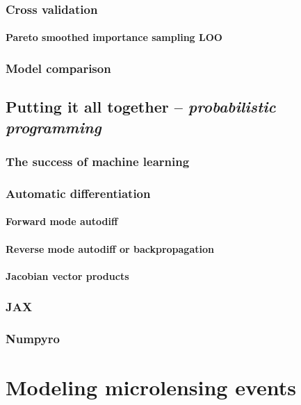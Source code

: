 \documentclass[]{report}
\begin{document}
\subsection{Cross validation}
\subsubsection{Pareto smoothed importance sampling LOO}
\subsection{Model comparison}

\section{Putting it all together -- \emph{probabilistic programming}}
\subsection{The success of machine learning}
\subsection{Automatic differentiation}
\subsubsection{Forward mode autodiff}
\subsubsection{Reverse mode autodiff or backpropagation}
\subsubsection{Jacobian vector products}
\subsection{JAX}
\subsection{Numpyro}

\chapter{Modeling microlensing events}
\end{document}
